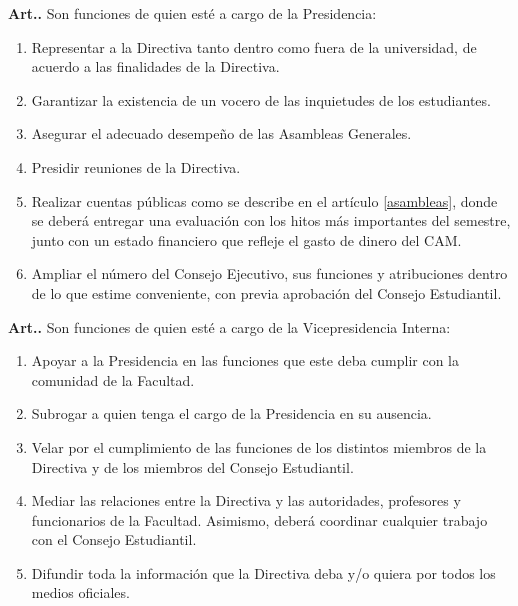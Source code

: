 \documentclass[letterpaper,11pt]{article}
\newcounter{art}
\newenvironment{art}{\refstepcounter{art}\mbox{\textbf{Art.{\space}\theart.}}\ignorespaces}{}
\begin{document}
\begin{art}\label{funcionesPresidencia}
    Son funciones de quien esté a cargo de la Presidencia:
    \begin{enumerate}
        \item Representar a la Directiva tanto dentro como fuera de la universidad, de acuerdo a las finalidades de la Directiva.
        \item Garantizar la existencia de un vocero de las inquietudes de los estudiantes.
        \item Asegurar el adecuado desempeño de las Asambleas Generales.
        \item Presidir reuniones de la Directiva.
        \item Realizar cuentas públicas como se describe en el artículo \ref{asambleas}, donde se deberá entregar una evaluación con los hitos más importantes del semestre, junto con un estado financiero que refleje el gasto de dinero del CAM.
        \item Ampliar el número del Consejo Ejecutivo, sus funciones y atribuciones dentro de lo que estime conveniente, con previa aprobación del Consejo Estudiantil.
    \end{enumerate}
\end{art}

\begin{art}\label{funcionesVicepresidenciaInterno}
    Son funciones de quien esté a cargo de la Vicepresidencia Interna:
    \begin{enumerate}
        \item Apoyar a la Presidencia en las funciones que este deba cumplir con la comunidad de la Facultad.
        \item Subrogar a quien tenga el cargo de la Presidencia en su ausencia.
        \item Velar por el cumplimiento de las funciones de los distintos miembros de la Directiva y de los miembros del Consejo Estudiantil.
        \item Mediar las relaciones entre la Directiva y las autoridades, profesores y funcionarios de la Facultad. Asimismo, deberá coordinar cualquier trabajo con el Consejo Estudiantil.
        \item Difundir toda la información que la Directiva deba y/o quiera por todos los medios oficiales.
    \end{enumerate}
\end{art}
\end{document}
